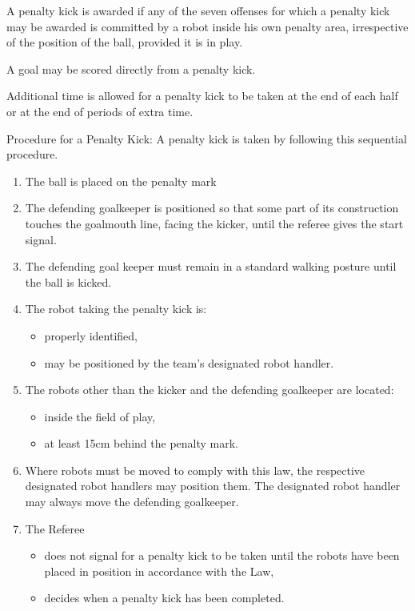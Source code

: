 \documentclass[12pt]{hurocup}
\begin{document}
\begin{lawlist}[US]
  
\item A penalty kick is awarded if any of the seven offenses for which
  a penalty kick may be awarded is committed by a robot inside his own
  penalty area, irrespective of the position of the ball, provided it
  is in play.
  
\item A goal may be scored directly from a penalty kick.
  
\item Additional time is allowed for a penalty kick to be taken at the
  end of each half or at the end of periods of extra time.
  
\item Procedure for a Penalty Kick: A penalty kick is taken by
  following this sequential procedure.
  \begin{enumerate}
    \item The ball is placed on the penalty mark
    \item  The defending goalkeeper is positioned so that some part of
      its construction touches the goalmouth line, facing the kicker,
      until the referee gives the start signal.
    \item The defending goal keeper must remain in a standard walking
      posture until the ball is kicked.
    \item The robot taking the penalty kick is: 
      \begin{itemize}
      \item properly identified,
      \item may be positioned by the team's designated robot handler.
      \end{itemize}
    \item The robots other than the kicker and the defending goalkeeper
      are located:
      \label{pk-other-players}
      \begin{itemize}
      \item inside the field of play,
      \item at least 15cm behind the penalty mark.
      \end{itemize}
    \item Where robots must be moved to comply with this law, the
      respective designated robot handlers may position them. The
      designated robot handler may always move the defending goalkeeper. 
    \item The Referee
      \begin{itemize}
      \item does not signal for a penalty kick to be taken until the
        robots have been placed in position in accordance with the Law,
      \item decides when a penalty kick has been completed.
      \end{itemize}
  \end{enumerate}   
  

\end{lawlist}
\end{document}
